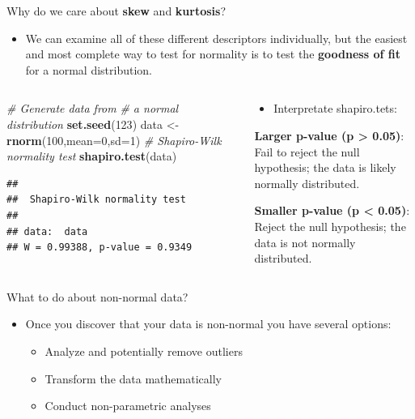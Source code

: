 \documentclass[
  ignorenonframetext,
]{beamer}
\newenvironment{Shaded}{\begin{snugshade}}{\end{snugshade}}
\newcommand{\AttributeTok}[1]{\textcolor[rgb]{0.13,0.29,0.53}{#1}}
\newcommand{\CommentTok}[1]{\textcolor[rgb]{0.56,0.35,0.01}{\textit{#1}}}
\newcommand{\DecValTok}[1]{\textcolor[rgb]{0.00,0.00,0.81}{#1}}
\newcommand{\FunctionTok}[1]{\textcolor[rgb]{0.13,0.29,0.53}{\textbf{#1}}}
\newcommand{\NormalTok}[1]{#1}
\newcommand{\OtherTok}[1]{\textcolor[rgb]{0.56,0.35,0.01}{#1}}
\providecommand{\tightlist}{%
  \setlength{\itemsep}{0pt}\setlength{\parskip}{0pt}}
\begin{document}
\begin{frame}[fragile]{Why do we care about \textbf{skew} and
\textbf{kurtosis}?}
\label{why-do-we-care-about-skew-and-kurtosis-2}
\begin{itemize}
\tightlist
\item
  We can examine all of these different descriptors individually, but
  the easiest and most complete way to test for normality is to test the
  \textbf{goodness of fit} for a normal distribution.
\end{itemize}

\begin{columns}[T]
\begin{column}{0.48\textwidth}
\begin{Shaded}
\begin{Highlighting}[]
\CommentTok{\# Generate data from }
\CommentTok{\# a normal distribution}
\FunctionTok{set.seed}\NormalTok{(}\DecValTok{123}\NormalTok{)}
\NormalTok{data }\OtherTok{\textless{}{-}} \FunctionTok{rnorm}\NormalTok{(}\DecValTok{100}\NormalTok{,}\AttributeTok{mean=}\DecValTok{0}\NormalTok{,}\AttributeTok{sd=}\DecValTok{1}\NormalTok{)}
\CommentTok{\# Shapiro{-}Wilk normality test}
\FunctionTok{shapiro.test}\NormalTok{(data)}
\end{Highlighting}
\end{Shaded}

\begin{verbatim}
## 
##  Shapiro-Wilk normality test
## 
## data:  data
## W = 0.99388, p-value = 0.9349
\end{verbatim}
\end{column}

\begin{column}{0.48\textwidth}
\begin{itemize}
\tightlist
\item
  Interpretate shapiro.tets:
\end{itemize}

\textbf{Larger p-value (p \textgreater{} 0.05)}: Fail to reject the null
hypothesis; the data is likely normally distributed.

\textbf{Smaller p-value (p \textless{} 0.05)}: Reject the null
hypothesis; the data is not normally distributed.
\end{column}
\end{columns}
\end{frame}

\begin{frame}{What to do about non-normal data?}
\label{what-to-do-about-non-normal-data}
\begin{itemize}
\item
  Once you discover that your data is non-normal you have several
  options:

  \begin{itemize}
  \tightlist
  \item
    Analyze and potentially remove outliers
  \item
    Transform the data mathematically
  \item
    Conduct non-parametric analyses
  \end{itemize}
\end{itemize}
\end{frame}
\end{document}
